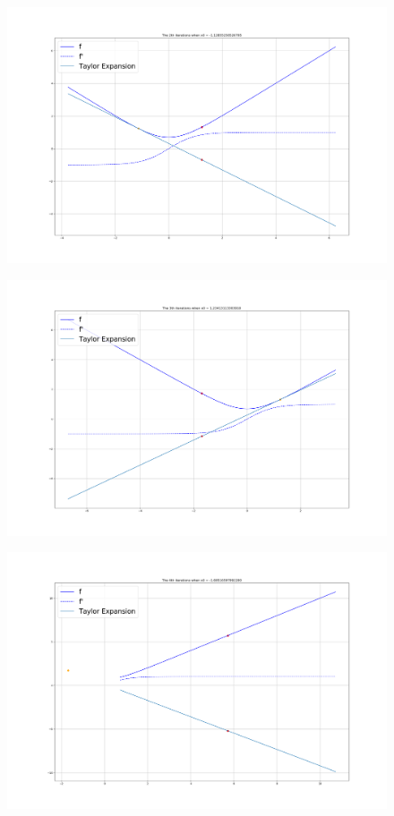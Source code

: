\documentclass{article}
\theoremstyle{definition}
\theoremstyle{definition}
\theoremstyle{remark}
\begin{document}
\begin{enumerate}
\begin{figure}[H]
    \end{figure}
    \begin{figure}[H]
        \centering
        \includegraphics[scale=0.25]{f22.png}
    \end{figure}
    \begin{figure}[H]
        \centering
        \includegraphics[scale=0.25]{f23.png}
    \end{figure}
    \begin{figure}[H]
        \centering
        \includegraphics[scale=0.25]{f24.png}

\end{figure}
\end{enumerate}
\end{document}

